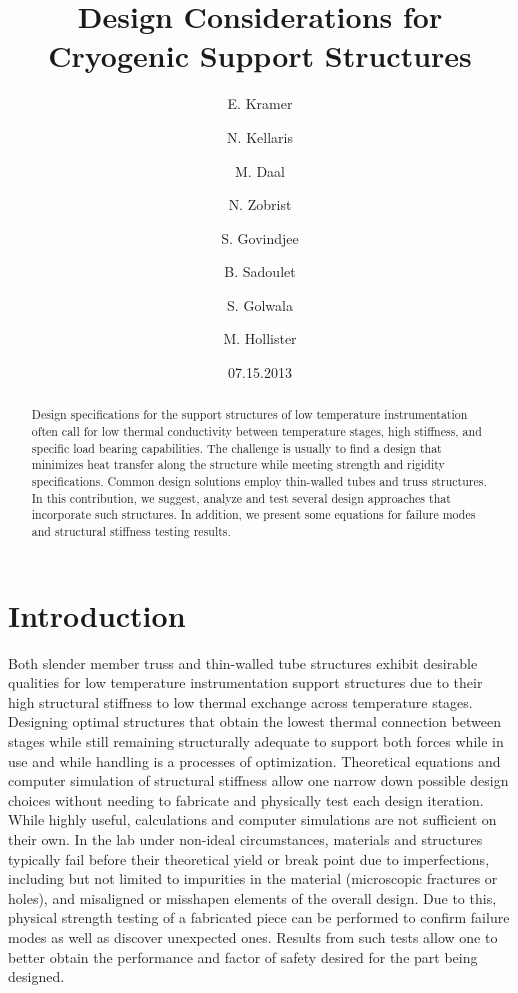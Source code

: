 \documentclass[final]{svjour2}
\begin{document}
\newcommand{\hdblarrow}{H\makebox[0.9ex][l]{$\downdownarrows$}-}
\title{Design Considerations for Cryogenic Support Structures}

\author{E. Kramer \and N. Kellaris  \and M. Daal \and N. Zobrist \and S. Govindjee \and B. Sadoulet \and S. Golwala \and M. Hollister}


\date{07.15.2013}

\maketitle

\begin{abstract}

Design specifications for the support structures of low temperature instrumentation often call for low thermal conductivity between temperature stages, high stiffness, and specific load bearing capabilities. The challenge is usually to find a design that minimizes heat transfer along the structure while meeting strength and rigidity specifications.  Common design solutions employ thin-walled tubes and truss structures. In this contribution, we suggest, analyze and test several design approaches that incorporate such structures. In addition, we present some equations for failure modes and structural stiffness testing results.


\end{abstract}

\section{Introduction}
Both slender member truss and thin-walled tube structures exhibit desirable qualities for low temperature instrumentation support structures due to their high structural stiffness to low thermal exchange across temperature stages.  Designing optimal structures that obtain the lowest thermal connection between stages while still remaining structurally adequate to support both forces while in use and while handling is a processes of optimization.  Theoretical equations and computer simulation of structural stiffness allow one narrow down possible design choices without needing to fabricate and physically test each design iteration.  While highly useful, calculations and computer simulations are not sufficient on their own. In the lab under non-ideal circumstances, materials and structures typically fail before their theoretical yield or break point due to imperfections, including but not limited to impurities in the material (microscopic fractures or holes), and misaligned or misshapen elements of the overall design.  Due to this, physical strength testing of a fabricated piece can be performed to confirm failure modes as well as discover unexpected ones.  Results from such tests allow one to better obtain the performance and factor of safety desired for the part being designed.
\end{document}
